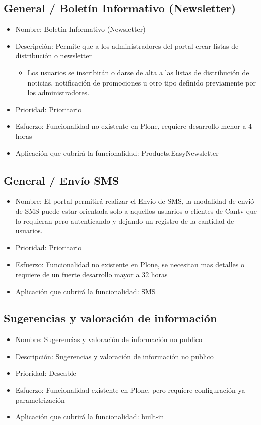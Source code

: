 \documentclass[11pt, letterpaper, oneside, spanish]{scrbook}
\begin{document}
\subsection{General / Boletín Informativo (Newsletter)}
\label{sec-2-1-49}

\begin{itemize}
\item Nombre: Boletín Informativo (Newsletter)
\item Descripción: Permite que a los administradores del portal crear listas de
  distribución o newsletter
\begin{itemize}
\item Los usuarios se inscribirán o darse de alta a las listas de distribución
    de noticias, notificación de promociones u otro tipo definido previamente
    por los administradores.
\end{itemize}
\item Prioridad: Prioritario
\item Esfuerzo: Funcionalidad no existente en Plone, requiere desarrollo menor a 4
  horas
\item Aplicación que cubrirá la funcionalidad: Products.EasyNewsletter
\end{itemize}
\subsection{General / Envío SMS}
\label{sec-2-1-50}

\begin{itemize}
\item Nombre: El portal permitirá realizar el Envío de SMS, la modalidad de envió
  de SMS puede estar orientada solo a aquellos usuarios o clientes de Cantv
  que lo requieran pero autenticando y dejando un registro de la cantidad de
  usuarios.
\item Prioridad: Prioritario
\item Esfuerzo: Funcionalidad no existente en Plone, se necesitan mas detalles o
  requiere de un fuerte desarrollo mayor a 32 horas
\item Aplicación que cubrirá la funcionalidad: SMS
\end{itemize}
\subsection{Sugerencias y valoración de información}
\label{sec-2-1-51}

\begin{itemize}
\item Nombre: Sugerencias y valoración de información no publico
\item Descripción: Sugerencias y valoración de información no publico
\item Prioridad: Deseable
\item Esfuerzo: Funcionalidad existente en Plone, pero requiere configuración ya
  parametrización
\item Aplicación que cubrirá la funcionalidad:  built-in
\end{itemize}
\end{document}
